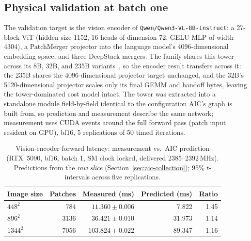 \subsection{Physical validation at batch one}
\label{sec:aic-validation}

The validation target is the vision encoder of
\texttt{Qwen/Qwen3-VL-8B-Instruct}: a 27-block ViT (hidden size 1152, 16
heads of dimension 72, GELU MLP of width 4304), a PatchMerger projector into
the language model's \num{4096}-dimensional embedding space, and three
DeepStack mergers. The family shares this tower across its 8B, 32B, and 235B
variants~\cite{Qwen3VL2025}, so the encoder result transfers across it: the
235B shares the 4096-dimensional projector target unchanged, and the 32B's
5120-dimensional projector scales only its final GEMM and handoff bytes,
leaving the tower-dominated cost model intact. The tower was extracted into
a standalone module field-by-field identical to the configuration AIC's
graph is built from, so prediction and measurement describe the same
network; measurement uses CUDA events around the full forward pass (patch
input resident on GPU), bf16, 5 replications of 50 timed iterations.

\begin{table}[htbp]
\centering
\caption[Encoder forward: measurement versus AIC prediction]{Vision-encoder
forward latency: measurement vs.\ AIC prediction (RTX~5090, bf16, batch 1,
SM clock locked, delivered 2385--2392\,\si{\mega\hertz}). Predictions from
the \emph{raw slice} (Section~\ref{sec:aic-collection}); 95\% $t$-intervals
across five replications.}
\label{tab:aic-validation}
\begin{tabular}{lrrrr}
\toprule
Image size & Patches & Measured (ms) & Predicted (ms) & Ratio \\
\midrule
$448^2$  & 784   & $11.360 \pm 0.006$  & 7.822  & 1.45 \\
$896^2$  & 3136  & $36.421 \pm 0.010$  & 31.973 & 1.14 \\
$1344^2$ & 7056  & $103.824 \pm 0.022$ & 89.347 & 1.16 \\
\bottomrule
\end{tabular}
\end{table}

